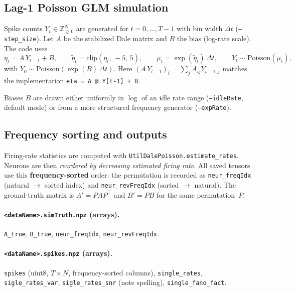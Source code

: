 \documentclass[11pt]{article}
\begin{document}
\subsection{Lag-1 Poisson GLM simulation}

Spike counts $Y_t \in \mathbb{Z}_{\ge 0}^N$ are generated for $t=0,\ldots,T-1$ with bin width $\Delta t$ (\texttt{--step\_size}). Let $A$ be the stabilized Dale matrix and $B$ the bias (log-rate scale). The code uses
\begin{equation}
  \eta_t = A\,Y_{t-1} + B,\qquad
  \tilde{\eta}_t = \mathrm{clip}(\eta_t,\,-5,\,5),\qquad
  \mu_t = \exp(\tilde{\eta}_t)\,\Delta t,\qquad
  Y_t \sim \mathrm{Poisson}(\mu_t),
\end{equation}
with $Y_0 \sim \mathrm{Poisson}(\exp(B)\,\Delta t)$. Here $(A\,Y_{t-1})_i = \sum_j A_{ij} Y_{t-1,j}$ matches the implementation \texttt{eta = A @ Y[t-1] + B}.

Biases $B$ are drawn either uniformly in $\log$ of an idle rate range (\texttt{--idleRate}, default mode) or from a more structured frequency generator (\texttt{--expRate}).

\subsection{Frequency sorting and outputs}

Firing-rate statistics are computed with \texttt{UtilDalePoisson.estimate\_rates}. Neurons are then \emph{reordered by decreasing estimated firing rate}. All saved tensors use this \textbf{frequency-sorted} order: the permutation is recorded as \texttt{neur\_freqIdx} (natural $\to$ sorted index) and \texttt{neur\_revFreqIdx} (sorted $\to$ natural). The ground-truth matrix is $A' = P A P^\top$ and $B' = P B$ for the same permutation~$P$.

\paragraph{\texttt{<dataName>.simTruth.npz} (arrays).}
\texttt{A\_true}, \texttt{B\_true}, \texttt{neur\_freqIdx}, \texttt{neur\_revFreqIdx}.

\paragraph{\texttt{<dataName>.spikes.npz} (arrays).}
\texttt{spikes} (uint8, $T\times N$, frequency-sorted columns), \texttt{single\_rates}, \texttt{sigle\_rates\_var}, \texttt{sigle\_rates\_snr} (note spelling), \texttt{single\_fano\_fact}.
\end{document}
